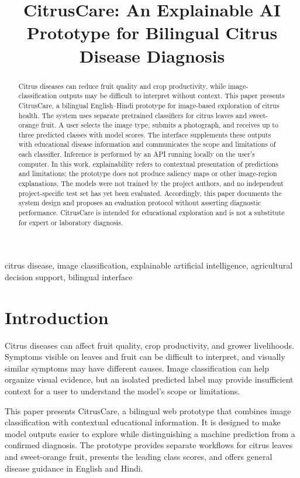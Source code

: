 \documentclass[conference]{IEEEtran}
\title{CitrusCare: An Explainable AI Prototype for Bilingual Citrus Disease Diagnosis}
\author{
\IEEEauthorblockN{Vidhi Bodhare \and Shubh Kamle}
\IEEEauthorblockA{[Department], [Institution]\\
[City, Country]\\
[Corresponding author email]}
}
\begin{document}
\maketitle

\begin{abstract}
Citrus diseases can reduce fruit quality and crop productivity, while image-classification outputs may be difficult to interpret without context. This paper presents CitrusCare, a bilingual English--Hindi prototype for image-based exploration of citrus health. The system uses separate pretrained classifiers for citrus leaves and sweet-orange fruit. A user selects the image type, submits a photograph, and receives up to three predicted classes with model scores. The interface supplements these outputs with educational disease information and communicates the scope and limitations of each classifier. Inference is performed by an API running locally on the user's computer. In this work, explainability refers to contextual presentation of predictions and limitations; the prototype does not produce saliency maps or other image-region explanations. The models were not trained by the project authors, and no independent project-specific test set has yet been evaluated. Accordingly, this paper documents the system design and proposes an evaluation protocol without asserting diagnostic performance. CitrusCare is intended for educational exploration and is not a substitute for expert or laboratory diagnosis.
\end{abstract}

\begin{IEEEkeywords}
citrus disease, image classification, explainable artificial intelligence, agricultural decision support, bilingual interface
\end{IEEEkeywords}

\section{Introduction}
Citrus diseases can affect fruit quality, crop productivity, and grower livelihoods. Symptoms visible on leaves and fruit can be difficult to interpret, and visually similar symptoms may have different causes. Image classification can help organize visual evidence, but an isolated predicted label may provide insufficient context for a user to understand the model's scope or limitations.

This paper presents CitrusCare, a bilingual web prototype that combines image classification with contextual educational information. It is designed to make model outputs easier to explore while distinguishing a machine prediction from a confirmed diagnosis. The prototype provides separate workflows for citrus leaves and sweet-orange fruit, presents the leading class scores, and offers general disease guidance in English and Hindi.
\end{document}
